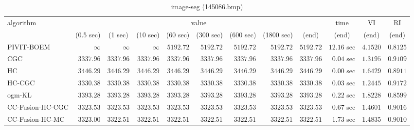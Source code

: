\begin{table}[H]
\scriptsize
\centering
\caption{image-seg (145086.bmp)}
\label{tab:anytimetable-image-seg-145086.bmp}
\begin{tabular}{lrrrrrrrrrrr}
\toprule
           algorithm &                                   \multicolumn{8}{c}{value} & \multicolumn{1}{c}{time}    & \multicolumn{1}{c}{VI}  & \multicolumn{1}{c}{RI} \\  
\cmidrule(lr){2-9}\cmidrule(lr){10-10} \cmidrule(lr){11-11} \cmidrule(lr){12-12}   
                     & \multicolumn{1}{c}{(0.5 sec)} & \multicolumn{1}{c}{(1 sec)} & \multicolumn{1}{c}{(10 sec)} & \multicolumn{1}{c}{(60 sec)} & \multicolumn{1}{c}{(300 sec)} & \multicolumn{1}{c}{(600 sec)} & \multicolumn{1}{c}{(1800 sec)} & \multicolumn{1}{c}{(end)} & \multicolumn{1}{c}{(end)}    & \multicolumn{1}{c}{(end)}   & \multicolumn{1}{c}{(end)}  \\ \midrule 
          PIVIT-BOEM & $\infty$ & $\infty$ & $\infty$ & $      5192.72$ & $      5192.72$ & $      5192.72$ & $      5192.72$ & $      5192.72$ & $        12.16$ sec    & $       4.1520$  & $       0.8125$ \\ 
                 CGC & $      3337.96$ & $      3337.96$ & $      3337.96$ & $      3337.96$ & $      3337.96$ & $      3337.96$ & $      3337.96$ & $      3337.96$ & $         0.04$ sec    & $       1.3195$  & $       0.9109$ \\ 
                  HC & $      3446.29$ & $      3446.29$ & $      3446.29$ & $      3446.29$ & $      3446.29$ & $      3446.29$ & $      3446.29$ & $      3446.29$ & $         0.00$ sec    & $       1.6429$  & $       0.8911$ \\ 
              HC-CGC & $      3330.38$ & $      3330.38$ & $      3330.38$ & $      3330.38$ & $      3330.38$ & $      3330.38$ & $      3330.38$ & $      3330.38$ & $         0.03$ sec    & $       1.2445$  & $       0.9172$ \\ 
              ogm-KL & $      3393.28$ & $      3393.28$ & $      3393.28$ & $      3393.28$ & $      3393.28$ & $      3393.28$ & $      3393.28$ & $      3393.28$ & $         0.22$ sec    & $       1.8228$  & $       0.8599$ \\ 
    CC-Fusion-HC-CGC & $      3323.53$ & $      3323.53$ & $      3323.53$ & $      3323.53$ & $      3323.53$ & $      3323.53$ & $      3323.53$ & $      3323.53$ & $         0.67$ sec    & $       1.4601$  & $       0.9016$ \\ 
     CC-Fusion-HC-MC & $      3323.00$ & $      3322.51$ & $      3322.51$ & $      3322.51$ & $      3322.51$ & $      3322.51$ & $      3322.51$ & $      3322.51$ & $         1.73$ sec    & $       1.4835$  & $       0.9010$ \\ 

\end{tabular}
\end{table}
